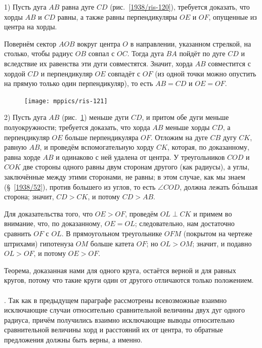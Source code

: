 \documentclass[oneside]{book}
\begin{document}
1) Пусть дуга $AB$ равна дуге $CD$ (рис.~\ref{1938/ris-120}), требуется доказать, что хорды $AB$ и $CD$ равны, а также равны перпендикуляры $OE$ и $OF$, опущенные из центра на хорды.

Повернём сектор $AOB$ вокруг центра $O$ в направлении, указанном стрелкой, на столько, чтобы радиус $OB$ совпал с $OC$.
Тогда дуга $BA$ пойдёт по дуге $CD$ и вследствие их равенства эти дуги совместятся.
Значит, хорда $AB$ совместится с хордой $CD$ и перпендикуляр $OE$ совпадёт с $OF$ (из одной точки можно опустить на прямую только один перпендикуляр), то есть
$AB=CD$ и $OE=OF$.

\begin{figure}
\centering
\texttt{[image: mppics/ris-121]}
\caption{}\label{1938/ris-121}
\end{figure}

2) Пусть дуга $AB$ (рис.~\ref{1938/ris-121}) меньше дуги $CD$, и притом обе дуги меньше полуокружности;
требуется доказать, что хорда $AB$ меньше хорды $CD$, а перпендикуляр $OE$ больше перпендикуляра $OF$.
Отложим на дуге $CB$ дугу $CK$, равную $AB$, и проведём вспомогательную хорду $CK$, которая, по доказанному, равна хорде $AB$ и одинаково с ней удалена от центра.
У треугольников $COD$ и $COK$ две стороны одного равны двум сторонам другого (как радиусы), а углы, заключённые между этими сторонами, не равны;
в этом случае, как мы знаем (§~\ref{1938/52}), против большего из углов, то есть
$\angle COD$, должна лежать б\'{о}льшая сторона;
значит, $CD>CK$, и потому $CD>AB$.

Для доказательства того, что $OE>OF$, проведём $OL\perp CK$ и примем во внимание, что, по доказанному, $OE=OL$;
следовательно, нам достаточно сравнить $OF$ с $OL$.
В прямоугольном треугольнике $OFM$ (покрытом на чертеже штрихами) гипотенуза $OM$ больше катета $OF$;
но $OL>OM$;
значит, и подавно $OL>OF$, и потому $OE>OF$.

Теорема, доказанная нами для одного круга, остаётся верной и для равных кругов, потому что такие круги один от другого отличаются только положением.

\paragraph{}\label{1938/110}
.
Так как в предыдущем параграфе рассмотрены всевозможные взаимно исключающие случаи относительно сравнительной величины двух дуг одного радиуса, причём получились взаимно исключающие выводы относительно сравнительной величины хорд и расстояний их от центра, то обратные предложения должны быть верны, а именно.
\end{document}
